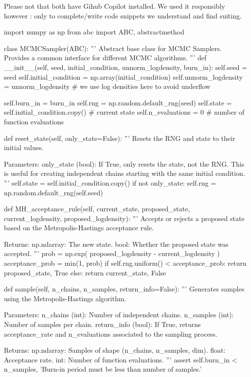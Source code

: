 \documentclass[a4paper, 12pt,oneside]{article}
\begin{document}
		Please not that both have Gihub Copilot installed. We used it responsibly however : only to complete/write code snippets we understand and find suiting.
		\begin{python}
			import numpy as np
			from abc import ABC, abstractmethod

			class MCMCSampler(ABC):
				'''
				Abstract base class for MCMC Samplers. Provides a common interface for different MCMC algorithms.
				'''
				def __init__(self, seed, initial_condition, unnorm_logdensity, burn_in):
					self.seed = seed
					self.initial_condition = np.array(initial_condition)
					self.unnorm_logdensity = unnorm_logdensity
					# we use log densities here to avoid underflow
					
					self.burn_in = burn_in
					self.rng = np.random.default_rng(seed)
					self.state = self.initial_condition.copy() # current state
					self.n_evaluations = 0 # number of function evaluations
				
				def reset_state(self, only_state=False):
					'''
					Resets the RNG and state to their initial values.

					Parameters:
					only_state (bool): If True, only resets the state, not the RNG. This is useful for creating independent chains starting with the same initial condition.
					'''
					self.state = self.initial_condition.copy()
					if not only_state:
						self.rng = np.random.default_rng(self.seed)
				
				def MH_acceptance_rule(self, current_state, proposed_state, current_logdensity, proposed_logdensity):
					'''
					Accepts or rejects a proposed state based on the Metropolis-Hastings acceptance rule.

					Returns:
					np.ndarray: The new state.
					bool: Whether the proposed state was accepted.
					'''
					prob = np.exp( proposed_logdensity - current_logdensity )
					acceptance_prob = min(1, prob)
					if self.rng.uniform() < acceptance_prob:
						return proposed_state, True
					else:
						return current_state, False

				def sample(self, n_chains, n_samples, return_info=False):
					'''
					Generates samples using the Metropolis-Hastings algorithm.

					Parameters:
					n_chains (int): Number of independent chains.
					n_samples (int): Number of samples per chain.
					return_info (bool): If True, returns acceptance_rate and n_evaluations associated to the sampling process.

					Returns:
					np.ndarray: Samples of shape (n_chains, n_samples, dim).
					float: Acceptance rate.
					int: Number of function evaluations.
					'''
					assert self.burn_in < n_samples, 'Burn-in period must be less than number of samples.'


\end{python}
\end{document}
